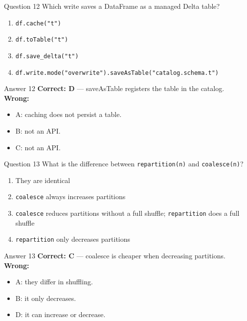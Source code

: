 \documentclass[aspectratio=169,11pt]{beamer}
\begin{document}
\begin{frame}{Question 12}
Which write saves a DataFrame as a managed Delta table?
\begin{enumerate}[label=\Alph*.]
\item \texttt{df.cache("t")}
\item \texttt{df.toTable("t")}
\item \texttt{df.save\_delta("t")}
\item \texttt{df.write.mode("overwrite").saveAsTable("catalog.schema.t")}
\end{enumerate}
\end{frame}
\begin{frame}{Answer 12}
\textbf{Correct: D} --- saveAsTable registers the table in the catalog.\\
\vspace{0.5em}
\textbf{Wrong:}
\begin{itemize}
\item A: caching does not persist a table.
\item B: not an API.
\item C: not an API.
\end{itemize}
\end{frame}

\begin{frame}{Question 13}
What is the difference between \texttt{repartition(n)} and \texttt{coalesce(n)}?
\begin{enumerate}[label=\Alph*.]
\item They are identical
\item \texttt{coalesce} always increases partitions
\item \texttt{coalesce} reduces partitions without a full shuffle; \texttt{repartition} does a full shuffle
\item \texttt{repartition} only decreases partitions
\end{enumerate}
\end{frame}
\begin{frame}{Answer 13}
\textbf{Correct: C} --- coalesce is cheaper when decreasing partitions.\\
\vspace{0.5em}
\textbf{Wrong:}
\begin{itemize}
\item A: they differ in shuffling.
\item B: it only decreases.
\item D: it can increase or decrease.
\end{itemize}
\end{frame}
\end{document}
